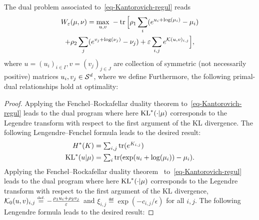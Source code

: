 \begin{prop}
	The dual problem associated to~\eqref{eq-Kantorovich-regul} reads
	\begin{multline}\label{eq-dual-pb}
		W_\varepsilon(\mu,\nu)
		= 
		\underset{u,v}{\max}\; - 
				\operatorname{tr}\Big[
						\rho_1 \sum_i (e^{u_i+\log(\mu_i)} - \mu_i) \\
					+   \rho_2 \sum_j (e^{v_j+\log(\nu_j)} - \nu_j)
					+    \varepsilon \sum_{i,j}  e^{ \mathcal{K}(u,v)_{i,j} }
			 \Big], 
	\end{multline}	
	where $u=(u_i)_{i \in I}, v=(v_j)_{j \in J}$ are collection of symmetric (not necessarily positive) matrices $u_i, v_j \in \mathcal{S}^d$, 
	where we define
	Furthermore, the following primal-dual relationships hold at optimality:
\end{prop}
\begin{proof} 
Applying the Fenchel--Rockafellar duality theorem  to~\eqref{eq-Kantorovich-regul} leads to the dual program
where here $\operatorname{KL}^*(\cdot|\mu)$ corresponds to the Legendre transform with respect to the first argument of the KL divergence.
%
The following Lengendre--Fenchel  formula leads to the desired result:
\begin{align*} %
	H^*(K) &= \textstyle\sum_{i,j} \tr( e^{K_{i,j}} ) \\
	\KL^*(u|\mu) &= \textstyle\sum_i \tr( \exp(u_i+\log(\mu_i)) - \mu_i).
\end{align*}
%
\fi
Applying the Fenchel--Rockafellar duality theorem~\cite{rockafellar-convex} to~\eqref{eq-Kantorovich-regul} leads to the dual program
where here $\operatorname{KL}^*(\cdot|\mu)$ corresponds to the Legendre transform with respect to the first argument of the KL divergence, $ \Kern_0(u,v)_{i,j} \eqdef -\frac{\rho_1 u_i + \rho_2 v_j}{\epsilon}$ and $\xi_{i,j} \eqdef \exp(-c_{i,j}/\epsilon)$ for all $i,j$.
%
The following Lengendre formula leads to the desired result:
\end{proof}


